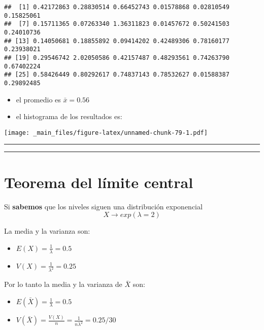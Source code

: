\documentclass[
]{book}
\providecommand{\tightlist}{%
  \setlength{\itemsep}{0pt}\setlength{\parskip}{0pt}}
\begin{document}
\begin{verbatim}
##  [1] 0.42172863 0.28830514 0.66452743 0.01578868 0.02810549 0.15825061
##  [7] 0.15711365 0.07263340 1.36311823 0.01457672 0.50241503 0.24010736
## [13] 0.14050681 0.18855892 0.09414202 0.42489306 0.78160177 0.23938021
## [19] 0.29546742 2.02050586 0.42157487 0.48293561 0.74263790 0.67402224
## [25] 0.58426449 0.80292617 0.74837143 0.78532627 0.01588387 0.29892485
\end{verbatim}

\begin{itemize}
\item
  el promedio es \(\bar{x}=0.56\)
\item
  el histograma de los resultados es:
\end{itemize}

\texttt{[image: \_main\_files/figure-latex/unnamed-chunk-79-1.pdf]}

\begin{center}\rule{0.5\linewidth}{0.5pt}\end{center}

\begin{center}\rule{0.5\linewidth}{0.5pt}\end{center}

\hypertarget{teorema-del-luxedmite-central-3}{%
\section{Teorema del límite central}\label{teorema-del-luxedmite-central-3}}

Si \textbf{sabemos} que los niveles siguen una distribución exponencial \[X \rightarrow exp(\lambda=2)\]

La media y la varianza son:

\begin{itemize}
\tightlist
\item
  \(E(X)=\frac{1}{\lambda}=0.5\)
\item
  \(V(X)=\frac{1}{\lambda^2}=0.25\)
\end{itemize}

Por lo tanto la media y la varianza de \(\bar{X}\) son:

\begin{itemize}
\tightlist
\item
  \(E(\bar{X})=\frac{1}{\lambda}=0.5\)
\item
  \(V(\bar{X})=\frac{V(X)}{n}=\frac{1}{n\lambda^2}=0.25/30\)
\end{itemize}
\end{document}
